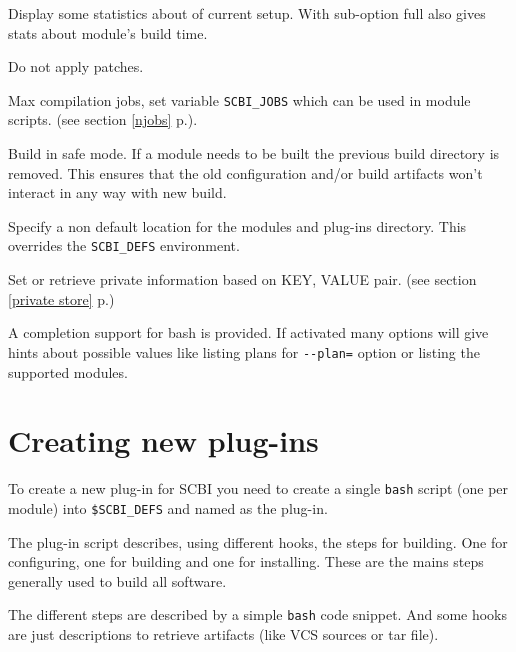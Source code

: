 \documentclass[a4paper,12pt,twoside]{article}
\newcommand{\code}[1]{\texttt{#1}}
\newcommand{\seeref}[1]{see section \ref{#1} p.\pageref{#1}}
\let\stdsection\section
\renewcommand\section{\newpage\stdsection}
\newcommand{\ddash}{-{}-}
\begin{document}
\begin{description}[font=\texttt]
	\item[\ddash{}stat:{[}full{]}] Display some statistics about of current setup. With sub-option full also gives stats about module's build time.

	\item[-n | \ddash{}no-patch] Do not apply patches.

	\item[-j | \ddash{}jobs=<n>] Max compilation jobs, set variable \code{SCBI\_JOBS} which can be used in module scripts. (\seeref{njobs}).

	\item[\ddash{}safe] Build in safe mode. If a module needs to be built the previous build directory is removed. This ensures that the old configuration and/or build artifacts won't interact in any way with new build.

	\item[\ddash{}plugins=<directory>] Specify a non default location for the modules and plug-ins directory. This overrides the \code{SCBI\_DEFS} environment.

	\item[\ddash{}store KEY <VALUE>] Set or retrieve private information based on KEY, VALUE pair. (\seeref{private store})

\end{description}

A completion support for bash is provided. If activated many options will give hints about possible values like listing plans for \code{\ddash{}plan=} option or listing the supported modules.


\section{Creating new plug-ins}

To create a new plug-in for SCBI you need to create a single \code{bash} script (one per module) into \code{\$SCBI\_DEFS} and named as the plug-in.

The plug-in script describes, using different hooks, the steps for building. One for configuring, one for building and one for installing. These are the mains steps generally used to build all software.

The different steps are described by a simple \code{bash} code snippet. And some hooks are just descriptions to retrieve artifacts (like VCS sources or tar file).
\end{document}
